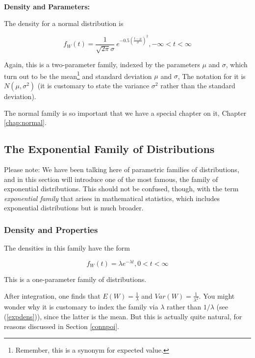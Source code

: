 {\bf Density and Parameters:}

The density for a normal distribution is

\begin{equation}
f_W(t) = \frac{1}{\sqrt{2\pi} \sigma} ~ e^{- 0.5 \left (\frac{t-\mu}{\sigma}
\right )^2}, -\infty < t < \infty
\end{equation}

Again, this is a two-parameter family, indexed by the parameters $\mu$
and $\sigma$, which turn out to be the mean\footnote{Remember, this is a
synonym for expected value.} and standard deviation  $\mu$ and $\sigma$,
The notation for it is $N(\mu,\sigma^2)$ (it is customary to state
the variance $\sigma^2$ rather than the standard deviation).

The normal family is so important that we have a special chapter on it,
Chapter \ref{chap:normal}.

\subsection{The Exponential Family of Distributions}
\label{exponfam}

Please note:  We have been talking here of parametric families of
distributions, and in this section will introduce one of the most
famous, the family of exponential distributions.  This should not be
confused, though, with the term {\it exponential family} that arises in
mathematical statistics, which includes exponential distributions but is
much broader.

\subsubsection{Density and Properties}
\label{expon}

The densities in this family have the form

\begin{equation}
\label{expdens}
f_W(t) = \lambda e^{-\lambda t}, 0 < t < \infty
\end{equation}

This is a one-parameter family of distributions. 

After integration, one finds that $E(W) = \frac{1}{\lambda}$ and $Var(W)
= \frac{1}{\lambda^2}$.  You might wonder why it is customary to index
the family via $\lambda$ rather than $1/\lambda$ (see (\ref{expdens})),
since the latter is the mean.  But this is actually quite natural, for
reasons discussed in Section \ref{connpoi}.

